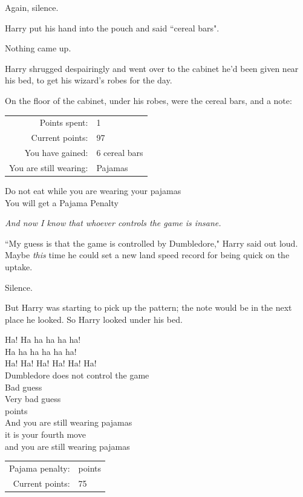 Again, silence.

Harry put his hand into the pouch and said ``cereal bars".

Nothing came up.

Harry shrugged despairingly and went over to the cabinet he'd been given near his bed, to get his wizard's robes for the day.

On the floor of the cabinet, under his robes, were the cereal bars, and a note:

\begin{writtenNote}
\begin{tabular}{rl}
Points spent: & 1\\
Current points: & 97\\
You have gained: & 6 cereal bars\\
You are still wearing: & Pajamas\\
\end{tabular}

Do not eat while you are wearing your pajamas\\
You will get a Pajama Penalty
\end{writtenNote}

\emph{And now I know that whoever controls the game is insane.}

``My guess is that the game is controlled by Dumbledore," Harry said out loud. Maybe \emph{this} time he could set a new land speed record for being quick on the uptake.

Silence.

But Harry was starting to pick up the pattern; the note would be in the next place he looked. So Harry looked under his bed.

\begin{writtenNote}
Ha! Ha ha ha ha ha!\\
Ha ha ha ha ha ha!\\
Ha! Ha! Ha! Ha! Ha! Ha!\\
Dumbledore does not control the game\\
Bad guess\\
Very bad guess\\
 points\\
And you are still wearing pajamas\\
it is your fourth move\\
and you are still wearing pajamas

\begin{tabular}{rl}
Pajama penalty: & \minus2 points\\
Current points: & 75
\end{tabular}
\end{writtenNote}


